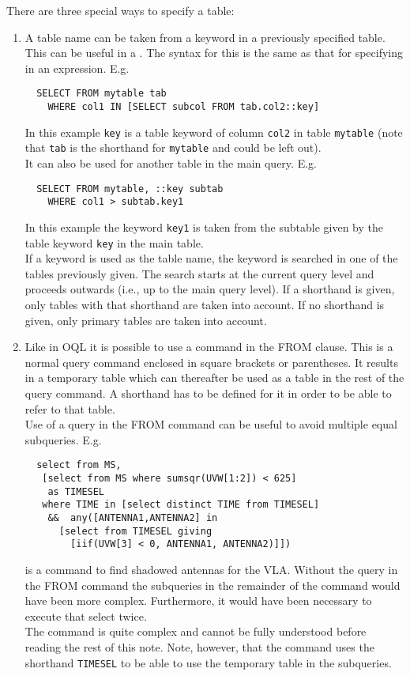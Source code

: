 There are three special ways to specify a table:
\begin{enumerate}

\item
A table name can be taken from a keyword in a previously
specified table. This can be useful in a
. The syntax for this is
the same as that for specifying 
in an expression. E.g.
\begin{verbatim}
  SELECT FROM mytable tab
    WHERE col1 IN [SELECT subcol FROM tab.col2::key]
\end{verbatim}
In this example \texttt{key} is a table keyword of column
\texttt{col2} in table \texttt{mytable} (note that \texttt{tab}
is the shorthand for \texttt{mytable} and could be left out).
\\It can also be used for another table in the main query. E.g.
\begin{verbatim}
  SELECT FROM mytable, ::key subtab
    WHERE col1 > subtab.key1
\end{verbatim}
In this example the keyword \texttt{key1} is taken from the
subtable given by the table keyword \texttt{key} in the main
table.
\\If a keyword is used as the table name, the keyword is
searched
in one of the tables previously given. The search starts at
the current query level and proceeds outwards (i.e., up to the
main query level). If a shorthand is given, only tables with
that shorthand are taken into account. If no shorthand is
given, only primary tables are taken into account.

\item
Like in OQL it is possible to use a
command in the FROM clause. This is a normal query command
enclosed in square brackets or parentheses.
It results in a temporary table
which can thereafter be used as a table in the rest of the
query command. A shorthand has to be defined for it in order
to be able to refer to that table.
\\Use of a query in the FROM command can be useful to avoid
multiple equal subqueries. E.g.
\begin{verbatim}
  select from MS,
   [select from MS where sumsqr(UVW[1:2]) < 625]
    as TIMESEL
   where TIME in [select distinct TIME from TIMESEL]
    &&  any([ANTENNA1,ANTENNA2] in
      [select from TIMESEL giving
        [iif(UVW[3] < 0, ANTENNA1, ANTENNA2)]])
\end{verbatim}
is a command to find shadowed antennas for the VLA.
Without the query in the FROM command the subqueries in the
remainder of the command would have been more complex.
Furthermore, it would have been necessary to execute that
select twice.
\\The command is quite complex and cannot be fully understood
before reading the rest of this note.
Note, however, that the command uses the shorthand \texttt{TIMESEL}
to be able to use the temporary table in the subqueries.


\end{enumerate}
